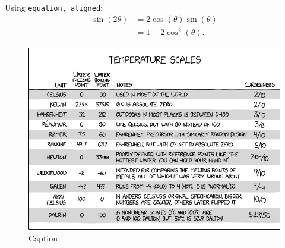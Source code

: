 \documentclass{article}
\begin{document}
Using \texttt{equation, aligned}:
\begin{equation} %
\begin{aligned} %
    \sin(2\theta) & = 2\cos(\theta)\sin(\theta) \\
    & = 1-2\cos^2(\theta).
\end{aligned}
\end{equation}

\begin{figure}
    \centering
    \includegraphics[width=\linewidth]{temperature_scales.png}
    \caption{Caption}
    \label{fig:temp-scales}
\end{figure}
\end{document}
